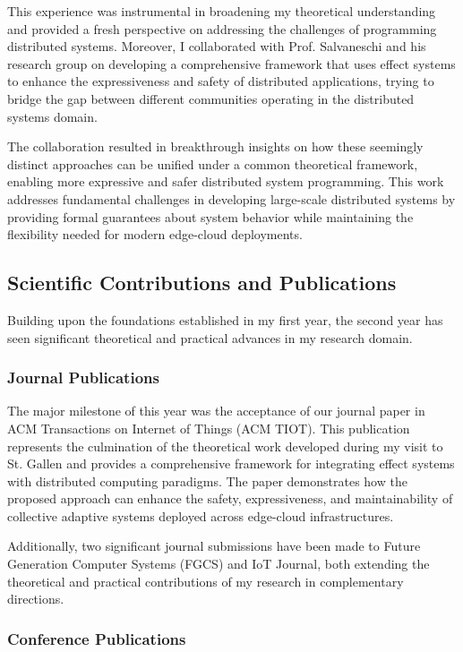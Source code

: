 \documentclass[runningheads]{llncs}
\begin{document}
This experience was instrumental in broadening my theoretical understanding and provided a fresh perspective on addressing the challenges of programming distributed systems.
%
Moreover,
I collaborated with Prof. Salvaneschi and his research group on developing a comprehensive framework that uses effect systems to enhance the expressiveness and safety of distributed applications,
trying to bridge the gap between different communities operating in the distributed systems domain.

The collaboration resulted in breakthrough insights on how these seemingly distinct approaches can be unified under a common theoretical framework,
enabling more expressive and safer distributed system programming.
%
This work addresses fundamental challenges in developing large-scale distributed systems by providing formal guarantees about system behavior while maintaining the flexibility needed for modern edge-cloud deployments.

\subsection{Scientific Contributions and Publications}

Building upon the foundations established in my first year, the second year has seen significant theoretical and practical advances in my research domain.

\subsubsection{Journal Publications}

The major milestone of this year was the acceptance of our journal paper in ACM Transactions on Internet of Things (ACM TIOT). This publication represents the culmination of the theoretical work developed during my visit to St. Gallen and provides a comprehensive framework for integrating effect systems with distributed computing paradigms. The paper demonstrates how the proposed approach can enhance the safety, expressiveness, and maintainability of collective adaptive systems deployed across edge-cloud infrastructures.

Additionally, two significant journal submissions have been made to Future Generation Computer Systems (FGCS) and IoT Journal, both extending the theoretical and practical contributions of my research in complementary directions.

\subsubsection{Conference Publications}
\end{document}
